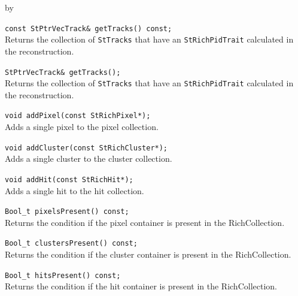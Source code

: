 \documentclass[twoside]{article}
\newcommand{\entrylabel}[1]{\mbox{\textbf{{#1}}}\hfil}%
\newenvironment{entry}
{\begin{list}{}%
    {\renewcommand{\makelabel}{\entrylabel}%
     \setlength{\labelwidth}{90pt}%
     \setlength{\leftmargin}{\labelwidth}
     \advance\leftmargin by \labelsep%
      }%
    }%
  {\end{list}}
\newcommand{\Entrylabel}[1]%
{\raisebox{0pt}[1ex][0pt]{\makebox[\labelwidth][l]%
    {\parbox[t]{\labelwidth}{\hspace{0pt}\textbf{{#1}}}}}}
\newenvironment{Entry}%
{\renewcommand{\entrylabel}{\Entrylabel}\begin{entry}}%
  {\end{entry}}
\begin{document}
\begin{Entry}
    \verb+const StPtrVecTrack& getTracks() const;+\\
    Returns the collection of \texttt{StTracks} that have an
    \texttt{StRichPidTrait} calculated in the reconstruction.

    \verb+StPtrVecTrack& getTracks();+\\
    Returns the collection of \texttt{StTracks} that have an
    \texttt{StRichPidTrait} calculated in the reconstruction.

    \verb+void addPixel(const StRichPixel*);+\\
    Adds a single pixel to the pixel collection.

    \verb+void addCluster(const StRichCluster*);+\\
    Adds a single cluster to the cluster collection.

    \verb+void addHit(const StRichHit*);+\\
    Adds a single hit to the hit collection.

    \verb+Bool_t pixelsPresent() const;+\\
    Returns the condition if the pixel container
    is present in the RichCollection.

    \verb+Bool_t clustersPresent() const;+\\
    Returns the condition if the cluster container
    is present in the RichCollection.

    \verb+Bool_t hitsPresent() const;+\\
    Returns the condition if the hit container
    is present in the RichCollection.
\end{Entry}
\clearpage
\end{document}
